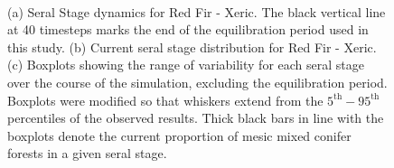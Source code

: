 \begin{figure}[!htbp]
  \centering
  \\
  \caption{(a) Seral Stage dynamics for Red Fir - Xeric. The black vertical line at 40 timesteps marks the end of the equilibration period used in this study. (b) Current seral stage distribution for Red Fir - Xeric. (c) Boxplots showing the range of variability for each seral stage over the course of the simulation, excluding the equilibration period. Boxplots were modified so that whiskers extend from the $5^{\text{th}} - 95^{\text{th}}$ percentiles of the observed results. Thick black bars in line with the boxplots denote the current proportion of mesic mixed conifer forests in a given seral stage.} 
  \label{fig:covcond_rfrx}
\end{figure}

